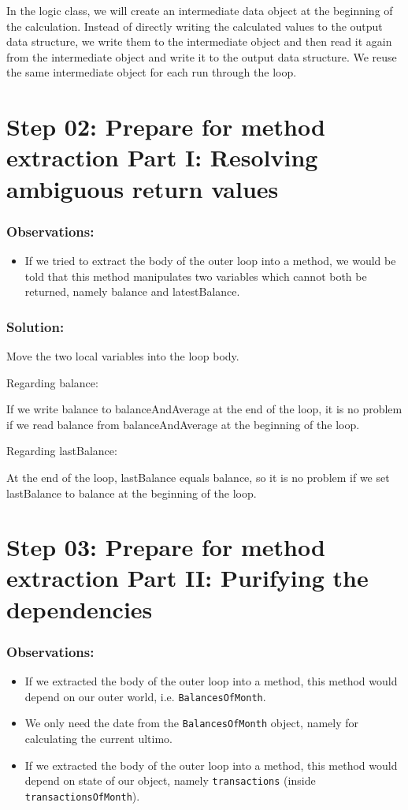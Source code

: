 \documentclass[a4paper,fleqn,titlepage,11pt]{article}
\begin{document}
In the logic class, we will create an intermediate data object at the beginning of the calculation. Instead of directly writing the calculated values to the output data structure, we write them to the intermediate object and then read it again from the intermediate object and write it to the output data structure. We reuse the same intermediate object for each run through the loop.

\section*{Step 02: Prepare for method extraction Part I: Resolving ambiguous return values}

\subsubsection*{Observations:}
\begin{itemize}
\item If we tried to extract the body of the outer loop into a method, we would be told that this method manipulates two variables which cannot both be returned, namely balance and latestBalance.
\end{itemize}

\subsubsection*{Solution:}

Move the two local variables into the loop body.

Regarding balance:

If we write balance to balanceAndAverage at the end of the loop, it is no problem if we read balance from balanceAndAverage at the beginning of the loop.

Regarding lastBalance:

At the end of the loop, lastBalance equals balance, so it is no problem if we set lastBalance to balance at the beginning of the loop.

\section*{Step 03: Prepare for method extraction Part II: Purifying the dependencies}

\subsubsection*{Observations:}
\begin{itemize}
\item If we extracted the body of the outer loop into a method, this method would depend on our outer world, i.e. \texttt{BalancesOfMonth}.
\item We only need the date from the \texttt{BalancesOfMonth} object, namely for calculating the current ultimo.
\item If we extracted the body of the outer loop into a method, this method would depend on state of our object, namely \texttt{transactions} (inside \texttt{transactionsOfMonth}).
\end{itemize}
\end{document}
